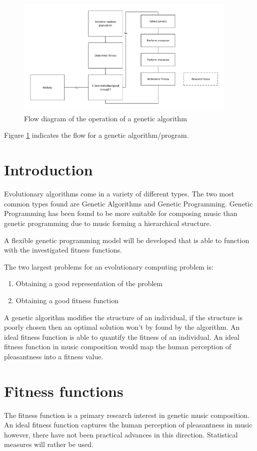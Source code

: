 \begin{figure}
\centerline{\includegraphics[width=400px]{../images/GA_flow.pdf}}
\caption{Flow diagram of the operation of a genetic algorithm}
\label{ims:geneticflow}
\end{figure}

Figure \ref{ims:geneticflow} indicates the flow for a genetic algorithm/program.

\section{Introduction}

Evolutionary algorithms come in a variety of different types. The two most common types found are Genetic Algorithms and Genetic Programming. Genetic Programming has been found to be more suitable for composing music than genetic programming due to music forming a hierarchical structure.

A flexible genetic programming model will be developed that is able to function with the investigated fitness functions. 

The two largest problems for an evolutionary computing problem is:
\begin{enumerate}
\item Obtaining a good representation of the problem
\item Obtaining a good fitness function
\end{enumerate}
A genetic algorithm modifies the structure of an individual, if the structure is poorly chosen then an optimal solution won't by found by the algorithm.
An ideal fitness function is able to quantify the fitness of an individual. An ideal fitness function in music composition would map the human perception of pleasantness into a fitness value. 

\section{Fitness functions}
The fitness function is a primary research interest in genetic music composition. 
An ideal fitness function captures the human perception of pleasantness in music however, there have not been practical advances in this direction. Statistical measures will rather be used.

